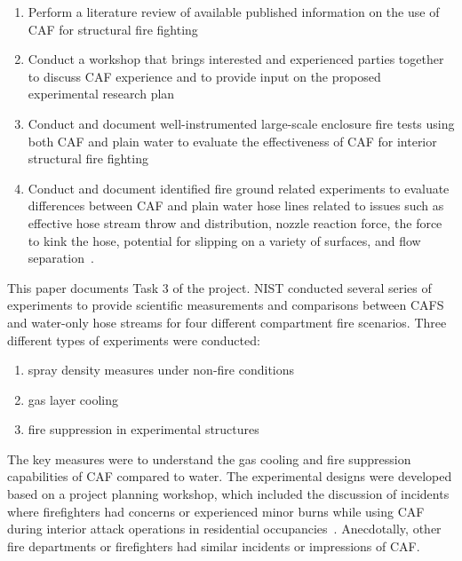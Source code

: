 \documentclass[12pt,oneside]{book}
\begin{document}
\begin{enumerate}
\item  Perform a literature review of available published information on the use of CAF for structural fire fighting~\cite{Mitchell:1}
\item  Conduct a workshop that brings interested and experienced parties together to discuss CAF experience and to provide input on the proposed experimental research plan~\cite{Grant:2011} 
\item  Conduct and document well-instrumented large-scale enclosure fire tests using both CAF and plain water to evaluate the effectiveness of CAF for interior structural fire fighting
\item  Conduct and document identified fire ground related experiments to evaluate differences between CAF and plain water hose lines related to issues such as effective hose stream throw and distribution, nozzle reaction force, the force to kink the hose, potential for slipping on a variety of surfaces, and flow separation~\cite{Carracino:2013,Dicus:2013,LaPolla:2012}. 
\end{enumerate}

This paper documents Task 3 of the project. NIST conducted several series of experiments to provide scientific measurements and comparisons between CAFS and water-only hose streams for four different compartment fire scenarios.  Three different types of experiments were conducted:
\begin{enumerate}
\item spray density measures under non-fire conditions
\item gas layer cooling
\item fire suppression in experimental structures
\end{enumerate}

The key measures were to understand the gas cooling and fire suppression capabilities of CAF compared to water. The experimental designs were developed based on a project planning workshop, which included the discussion of incidents where firefighters had concerns or experienced minor burns while using CAF during interior attack operations in residential occupancies~\cite{Grant:2011}. Anecdotally, other fire departments or firefighters had similar incidents or impressions of CAF.
\end{document}
